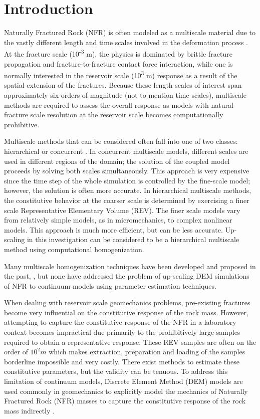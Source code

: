 \section{Introduction}
Naturally Fractured Rock (NFR) is often modeled as a multiscale material due to the vastly different length and time scales involved in the deformation process \citep{zhou_flow_2003}. At the fracture scale (10\textsuperscript{-3} m), the physics is dominated by brittle fracture propagation and fracture-to-fracture contact force interaction, while one is normally interested in the reservoir scale (10\textsuperscript{3} m) response as a result of the spatial extension of the fractures. Because these length scales of interest span approximately six orders of magnitude (not to mention time-scales), multiscale methods are required to assess the overall response as models with natural fracture scale resolution at the reservoir scale becomes computationally prohibitive.

Multiscale methods that can be considered often fall into one of two classes: hierarchical or concurrent \citep{Gracie_2011}. In concurrent multiscale models, different scales are used in different regions of the domain; the solution of the coupled model proceeds by solving both scales simultaneously. This approach is very expensive since the time step of the whole simulation is controlled by the fine-scale model; however, the solution is often more accurate. In hierarchical multiscale methods, the constitutive behavior at the coarser scale is determined by exercising a finer scale Representative Elementary Volume (REV). The finer scale models vary from relatively simple models, as in micromechanics, to complex nonlinear models. This approach is much more efficient, but can be less accurate. Up-scaling in this investigation can be considered to be a hierarchical multiscale method using computational homogenization. 

Many multiscale homogenization techniques have been developed and proposed in the past, \citep{Aanonsen_2006,Temizer_2009,Loehnert_2005}, but none have addressed the problem of up-scaling DEM simulations of NFR to continuum models using parameter estimation techniques.

When dealing with reservoir scale geomechanics problems, pre-existing fractures become very influential on the constitutive response of the rock mass. However, attempting to capture the constitutive response of the NFR in a laboratory context becomes impractical due primarily to the prohibitively large samples required to obtain a representative response. These REV samples are often on the order of $10^2m$ which makes extraction, preparation and loading of the samples borderline impossible and very costly. There exist methods to estimate these constitutive parameters, but the validity can be tenuous. To address this limitation of continuum models, Discrete Element Method (DEM) models are used commonly in geomechanics to explicitly model the mechanics of Naturally Fractured Rock (NFR) masses to capture the constitutive response of the rock mass indirectly \citep{jing_review_2003}. 

